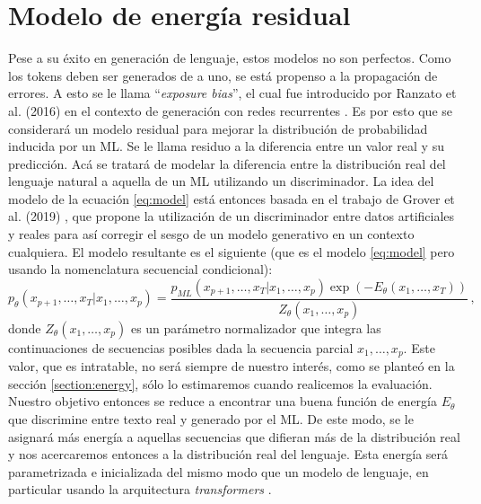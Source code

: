 \documentclass[letterpaper,11pt,oneside]{article}
\theoremstyle{break}
\begin{document}

\section{Modelo de energía residual}
Pese a su éxito en generación de lenguaje, estos modelos no son perfectos. Como los tokens deben ser generados de a uno, se está propenso a la propagación de errores. A esto se le llama ``\textit{exposure bias}'', el cual fue introducido por Ranzato et al. (2016) en el contexto de generación con redes recurrentes \cite{exposure}. Es por esto que se considerará un modelo residual para mejorar la distribución de probabilidad inducida por un ML. Se le llama residuo a la diferencia entre un valor real y su predicción. Acá se tratará de modelar la diferencia entre la distribución real del lenguaje natural a aquella de un ML utilizando un discriminador. La idea del modelo de la ecuación \ref{eq:model} está entonces basada en el trabajo de Grover et al. (2019) \cite{grover}, que propone la utilización de un discriminador entre datos artificiales y reales para así corregir el sesgo de un modelo generativo en un contexto cualquiera. El modelo resultante es el siguiente (que es el modelo \ref{eq:model} pero usando la nomenclatura secuencial condicional):
\begin{equation}
\label{eq:model_seq}
    p_{\theta}(x_{p+1},\dots,x_T|x_1,\dots,x_p) = \frac{p_{ML}(x_{p+1},\dots,x_T|x_1,\dots,x_p)\exp(-E_\theta(x_1,\dots,x_T))}{Z_\theta(x_1,\dots,x_p)} \,,
\end{equation}
donde $Z_\theta(x_1,\dots,x_p)$ es un parámetro normalizador que integra las continuaciones de secuencias posibles dada la secuencia parcial $x_1,\dots,x_p$. Este valor, que es intratable, no será siempre de nuestro interés, como se planteó en la sección \ref{section:energy}, sólo lo estimaremos cuando realicemos la evaluación. Nuestro objetivo entonces se reduce a encontrar una buena función de energía  $E_\theta$ que discrimine entre texto real y generado por el ML. De este modo, se le asignará más energía a aquellas secuencias que difieran más de la distribución real y nos acercaremos entonces a la distribución real del lenguaje. Esta energía será parametrizada e inicializada del mismo modo que un modelo de lenguaje, en particular usando la arquitectura \textit{transformers} \cite{transformer}.
\end{document}
